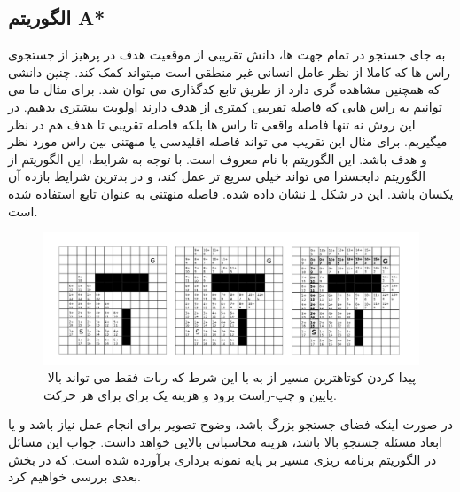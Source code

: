 \subsection{الگوریتم A*}
به جای جستجو در تمام جهت ها، دانش تقریبی از موقعیت هدف در پرهیز از جستجوی راس ها که کاملا از
 نظر عامل انسانی غیر منطقی است میتواند کمک کند. چنین دانشی که همچنین مشاهده گری دارد از طریق تابع 
کدگذاری می توان شد.
برای مثال ما می توانیم به راس هایی که فاصله تقریبی کمتری از هدف دارند اولویت بیشتری بدهیم. در این روش نه تنها فاصله واقعی تا راس ها بلکه  فاصله تقریبی تا هدف هم در نظر میگیریم. برای مثال این تقریب می تواند فاصله اقلیدسی یا منهتنی بین راس مورد نظر و هدف باشد. این الگوریتم با نام 
معروف است. با توجه به شرایط، این الگوریتم از الگوریتم دایجسترا می تواند خیلی سریع تر عمل کند، و در بدترین شرایط بازده آن یکسان باشد. این در شکل
\ref{fig:astar}
نشان داده شده.  فاصله منهتنی به عنوان تابع 
استفاده شده است.
\begin{figure}[H]
  \includegraphics[width = \textwidth]{images/astar.png}
  \caption{
 پیدا کردن کوتاهترین مسیر از  
  به
با این شرط که ربات فقط می تواند بالا-پایین و چپ-راست برود و هزینه یک برای برای هر حرکت.
  }
  \label{fig:astar}
\end{figure}
\par
{}
در صورت اینکه فضای جستجو بزرگ باشد، وضوح تصویر برای انجام عمل نیاز باشد و یا ابعاد مسئله جستجو بالا باشد،  هزینه محاسباتی بالایی خواهد داشت. جواب این مسائل در الگوریتم برنامه ریزی مسیر بر پایه نمونه برداری
برآورده شده است. که در بخش بعدی بررسی خواهیم کرد. 
